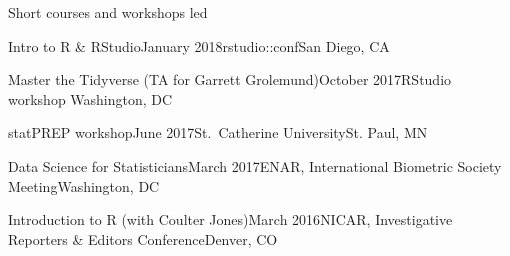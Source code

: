 \documentclass{resume} %
\begin{document}
\begin{rSection}{Short courses and workshops led}

\begin{sSubsection}{Intro to R \& RStudio}{}{January 2018}{rstudio::conf}{San Diego, CA}
\end{sSubsection}

\begin{sSubsection}{Master the Tidyverse}{ (TA for Garrett Grolemund)}{October 2017}{RStudio workshop }{Washington, DC}
\end{sSubsection}

\begin{sSubsection}{statPREP workshop}{}{June 2017}{St.~Catherine University}{St. Paul, MN}
\end{sSubsection}

\begin{sSubsection}{Data Science for Statisticians}{}{March 2017}{ENAR, International Biometric Society Meeting}{Washington, DC}
\end{sSubsection}

\begin{sSubsection}{Introduction to R }{(with Coulter Jones)}{March 2016}{NICAR, Investigative Reporters \& Editors Conference}{Denver, CO}
\end{sSubsection}



\end{rSection}

\end{document}
